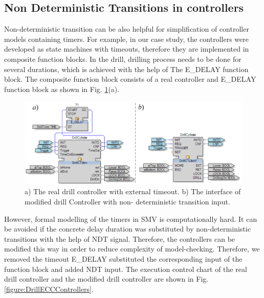 \documentclass[conference]{IEEEtran}
\begin{document}
\subsection{Non Deterministic Transitions in controllers}

Non-deterministic transition can be also helpful for simplification of controller models containing timers. For example, in our case study, the controllers were developed as state machines with timeouts, therefore they are implemented in composite function blocks. In the drill, drilling process needs to be done for several durations, which is achieved  with the help of The E\_DELAY function block. The composite function block consists of a real controller and E\_DELAY function block as shown in Fig. \ref{figure:DrillInterfaceControllers}(a). 

\begin{figure}
    \centering
    \includegraphics[scale = 0.33]{images/Fig9.png}
    \caption{ a) The real drill controller with external timeout. b) The interface of modified drill Controller with non- deterministic transition input.}
    \label{figure:DrillInterfaceControllers}
\end{figure}

However, formal modelling of the timers in SMV is computationally hard. It can be avoided if the concrete delay duration was substituted by non-deterministic transitions with the help of NDT signal. Therefore, the controllers can be modified this way in order to reduce complexity of model-checking. Therefore, we removed the timeout E\_DELAY substituted the corresponding input of the function  block and added NDT input. The execution control chart of the real drill controller and the modified drill controller are shown in Fig. \ref{figure:DrillECCControllers}.
\end{document}
